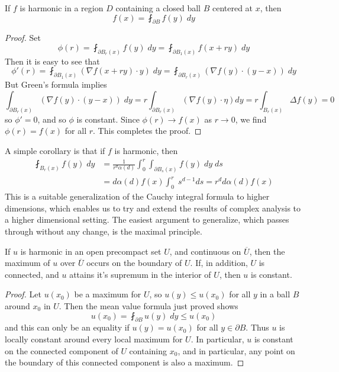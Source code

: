 \begin{theorem}
    If $f$ is harmonic in a region $D$ containing a closed ball $B$ centered at $x$, then
    \[ f(x) = \fint_{\partial B} f(y)\; dy \]
\end{theorem}
\begin{proof}
    Set
    \[ \phi(r) = \fint_{\partial B_r(x)} f(y)\; dy = \fint_{\partial B_1(x)} f(x + ry)\; dy \]
    Then it is easy to see that
    \[ \phi'(r) = \fint_{\partial B_1(x)} (\nabla f(x + ry) \cdot y)\; dy = \fint_{\partial B_r(x)} (\nabla f(y) \cdot (y-x))\; dy \]
    But Green's formula implies
    \[ \int_{\partial B_r(x)} (\nabla f(y) \cdot (y-x))\; dy = r \int_{\partial B_r(x)} (\nabla f(y) \cdot \eta) dy = r \int_{B_r(x)} \Delta f(y) = 0 \]
    so $\phi' = 0$, and so $\phi$ is constant. Since $\phi(r) \to f(x)$ as $r \to 0$, we find $\phi(r) = f(x)$ for all $r$. This completes the proof.
\end{proof}

A simple corollary is that if $f$ is harmonic, then
%
\begin{align*}
    \fint_{B_r(x)} f(y)\; dy &= \frac{1}{r^d \alpha(d)} \int_0^r \int_{\partial B_s(x)} f(y)\; dy\; ds\\
    &= d\alpha(d) f(x) \int_0^r\; s^{d-1} ds = r^d d \alpha(d) f(x)
\end{align*}
%
This is a suitable generalization of the Cauchy integral formula to higher dimensions, which enables us to try and extend the results of complex analysis to a higher dimensional setting. The easiest argument to generalize, which passes through without any change, is the maximal principle.

\begin{theorem}
    If $u$ is harmonic in an open precompact set $U$, and continuous on $\overline{U}$, then the maximum of $u$ over $\overline{U}$ occurs on the boundary of $U$. If, in addition, $U$ is connected, and $u$ attains it's supremum in the interior of $U$, then $u$ is constant.
\end{theorem}
\begin{proof}
    Let $u(x_0)$ be a maximum for $U$, so $u(y) \leq u(x_0)$ for all $y$ in a ball $B$ around $x_0$ in $U$. Then the mean value formula just proved shows
    \[ u(x_0) = \fint_{\partial B} u(y)\; dy \leq u(x_0) \]
    and this can only be an equality if $u(y) = u(x_0)$ for all $y \in \partial B$. Thus $u$ is locally constant around every local maximum for $U$. In particular, $u$ is constant on the connected component of $U$ containing $x_0$, and in particular, any point on the boundary of this connected component is also a maximum.
\end{proof}

